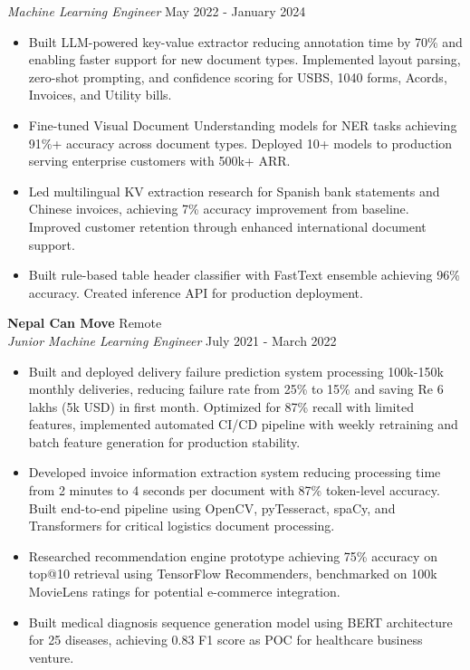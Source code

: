\documentclass[a4paper]{article}
\begin{document}
\textit{Machine Learning Engineer} \hfill May 2022 - January 2024\\
\vspace{-1mm}
\begin{itemize} \itemsep 0pt
	\item Built LLM-powered key-value extractor reducing annotation time by 70\% and enabling faster support for new document types. Implemented layout parsing, zero-shot prompting, and confidence scoring for USBS, 1040 forms, Acords, Invoices, and Utility bills.
	\item Fine-tuned Visual Document Understanding models for NER tasks achieving 91\%+ accuracy across document types. Deployed 10+ models to production serving enterprise customers with 500k+ ARR.
	\item Led multilingual KV extraction research for Spanish bank statements and Chinese invoices, achieving 7\% accuracy improvement from baseline. Improved customer retention through enhanced international document support.
	\item Built rule-based table header classifier with FastText ensemble achieving 96\% accuracy. Created inference API for production deployment.
\end{itemize}

\textbf{Nepal Can Move} \hfill Remote\\
\textit{Junior Machine Learning Engineer} \hfill July 2021 - March 2022\\
\vspace{-1mm}
\begin{itemize} \itemsep 0pt
	\item Built and deployed delivery failure prediction system processing 100k-150k monthly deliveries, reducing failure rate from 25\% to 15\% and saving Re 6 lakhs (5k USD) in first month. Optimized for 87\% recall with limited features, implemented automated CI/CD pipeline with weekly retraining and batch feature generation for production stability.
	\item Developed invoice information extraction system reducing processing time from 2 minutes to 4 seconds per document with 87\% token-level accuracy. Built end-to-end pipeline using OpenCV, pyTesseract, spaCy, and Transformers for critical logistics document processing.
	\item Researched recommendation engine prototype achieving 75\% accuracy on top@10 retrieval using TensorFlow Recommenders, benchmarked on 100k MovieLens ratings for potential e-commerce integration.
	\item Built medical diagnosis sequence generation model using BERT architecture for 25 diseases, achieving 0.83 F1 score as POC for healthcare business venture.
\end{itemize}
\end{document}

